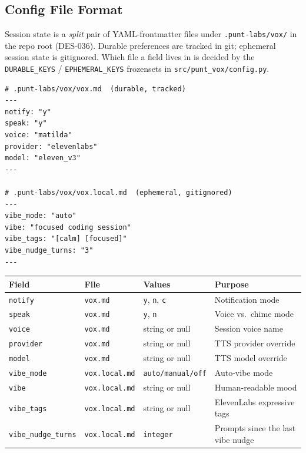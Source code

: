 \documentclass[a4paper,10pt]{article}
\newcommand{\modpath}[1]{\texttt{src/punt\_vox/#1}}
\newcommand{\field}[1]{\texttt{#1}}
\begin{document}
\subsection{Config File Format}

Session state is a \emph{split} pair of YAML-frontmatter files under
\texttt{.punt-labs/vox/} in the repo root (DES-036).  Durable
preferences are tracked in git; ephemeral session state is gitignored.
Which file a field lives in is decided by the \texttt{DURABLE\_KEYS} /
\texttt{EPHEMERAL\_KEYS} frozensets in \modpath{config.py}.

\begin{lstlisting}
# .punt-labs/vox/vox.md  (durable, tracked)
---
notify: "y"
speak: "y"
voice: "matilda"
provider: "elevenlabs"
model: "eleven_v3"
---

# .punt-labs/vox/vox.local.md  (ephemeral, gitignored)
---
vibe_mode: "auto"
vibe: "focused coding session"
vibe_tags: "[calm] [focused]"
vibe_nudge_turns: "3"
---
\end{lstlisting}

\begin{center}
\begin{tabular}{lllp{4.3cm}}
\toprule
\textbf{Field} & \textbf{File} & \textbf{Values} & \textbf{Purpose} \\
\midrule
\field{notify}       & \texttt{vox.md} & \texttt{y}, \texttt{n}, \texttt{c} &
  Notification mode \\
\field{speak}        & \texttt{vox.md} & \texttt{y}, \texttt{n} &
  Voice vs.\ chime mode \\
\field{voice}        & \texttt{vox.md} & string or null &
  Session voice name \\
\field{provider}     & \texttt{vox.md} & string or null &
  TTS provider override \\
\field{model}        & \texttt{vox.md} & string or null &
  TTS model override \\
\field{vibe\_mode}   & \texttt{vox.local.md} & \texttt{auto/manual/off} &
  Auto-vibe mode \\
\field{vibe}         & \texttt{vox.local.md} & string or null &
  Human-readable mood \\
\field{vibe\_tags}   & \texttt{vox.local.md} & string or null &
  ElevenLabs expressive tags \\
\field{vibe\_nudge\_turns} & \texttt{vox.local.md} & \texttt{integer} &
  Prompts since the last vibe nudge \\
\bottomrule
\end{tabular}
\end{center}
\end{document}
